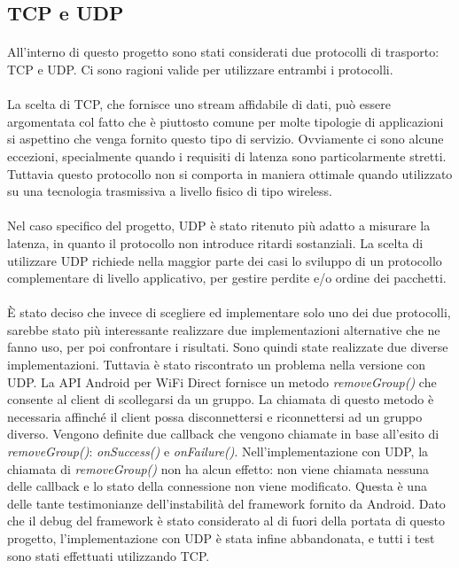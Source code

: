 \documentclass{llncs}
\begin{document}
\subsection{TCP e UDP}
\paragraph{} All'interno di questo progetto sono stati considerati due protocolli di trasporto: TCP e UDP. Ci sono ragioni valide per utilizzare entrambi i protocolli.
\paragraph{} La scelta di TCP, che fornisce uno stream affidabile di dati, può essere argomentata col fatto che è piuttosto comune per molte
tipologie di applicazioni si aspettino che venga fornito questo tipo di servizio. Ovviamente ci sono alcune eccezioni, specialmente quando i requisiti di
latenza sono particolarmente stretti. Tuttavia questo protocollo non si comporta in maniera ottimale quando utilizzato su una tecnologia trasmissiva a livello fisico di tipo wireless.
\paragraph{} Nel caso specifico del progetto, UDP è stato ritenuto più adatto a misurare la latenza, in quanto il protocollo non introduce ritardi sostanziali.
La scelta di utilizzare UDP richiede nella maggior parte dei casi lo sviluppo di un protocollo complementare di livello applicativo, per gestire perdite e/o ordine dei pacchetti.
\paragraph{} È stato deciso che invece di scegliere ed implementare solo uno dei due protocolli, sarebbe stato più interessante realizzare due implementazioni alternative che ne fanno uso, per poi confrontare i risultati. Sono quindi state realizzate due diverse implementazioni. Tuttavia è stato riscontrato un
problema nella versione con UDP. La API Android per WiFi Direct fornisce un metodo \emph{removeGroup()} che consente al client di scollegarsi da un gruppo. La chiamata di questo metodo è necessaria affinché il client possa disconnettersi e riconnettersi ad un gruppo diverso. Vengono definite due callback che vengono
chiamate in base all'esito di \emph{removeGroup()}: \emph{onSuccess()} e \emph{onFailure()}. Nell'implementazione con UDP, la chiamata di \emph{removeGroup()}
non ha alcun effetto: non viene chiamata nessuna delle callback e lo stato della connessione non viene modificato. Questa è una delle tante testimonianze
dell'instabilità del framework fornito da Android. Dato che il debug del framework è stato considerato al di fuori della portata di questo progetto,
l'implementazione con UDP è stata infine abbandonata, e tutti i test sono stati effettuati utilizzando TCP.
		
\end{document}
